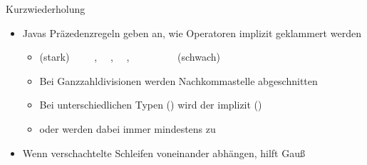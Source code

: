 {\begin{frame}[fragile,c]{Kurzwiederholung}
\begin{itemize}[<+(1)->]
\begin{itemize}
            \item {}~\k~~\k~~\k~~\k~~\k~~~und~~~\k~
        \end{itemize}
        \item Javas Präzedenzregeln geben an, wie Operatoren implizit geklammert werden \begin{itemize}
            \item \textcolor{codeouthl}{(stark)}~~~\T{\a++}~\K~\T{!\a}, \T{++\a}~\K~\T{\a\,/\,\b}, \T{\a\,*\,\b}~\K~\T{\a\,+\,\b}, \T{\a\,-\,\b}~\K~\T{\a\,==\,\b}~\K~\T{\a\,\&\&\,\b}~\K~\T{\a\,|\!|\,\b}~~~\textcolor{codeouthl}{(schwach)}%
            \item Bei Ganzzahldivisionen werden Nachkommastelle abgeschnitten 
            \item Bei unterschiedlichen Typen () wird der  implizit  ()
            \item {} oder  werden dabei immer mindestens zu  
        \end{itemize}
        \item Wenn verschachtelte Schleifen voneinander abhängen, hilft Gauß %
    \end{itemize}
\end{frame}

}
